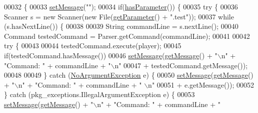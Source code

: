 \begin{DoxyCode}
00032                                                                                                            
        \{
00033         \hyperlink{classpkg__commands_1_1Command_ae210ff216fe908b111ba1c988a963d13}{setMessage}(\textcolor{stringliteral}{""});
00034         \textcolor{keywordflow}{if}(\hyperlink{classpkg__commands_1_1Command_a02af95ab3f1898a66259ab7c177b6998}{hasParameter}()) \{
00035             \textcolor{keywordflow}{try} \{
00036                 Scanner s = \textcolor{keyword}{new} Scanner(\textcolor{keyword}{new} File(\hyperlink{classpkg__commands_1_1Command_a41c92d445be73ea9d62320c65efb8434}{getParameter}() + \textcolor{stringliteral}{".test"}));
00037                 \textcolor{keywordflow}{while} (s.hasNextLine()) \{
00038 
00039                     String commandLine = s.nextLine();
00040                     Command testedCommand = Parser.getCommand(commandLine);
00041 
00042                     \textcolor{keywordflow}{try} \{
00043 
00044                         testedCommand.execute(player);
00045                         \textcolor{keywordflow}{if}(testedCommand.hasMessage())
00046                             \hyperlink{classpkg__commands_1_1Command_ae210ff216fe908b111ba1c988a963d13}{setMessage}(\hyperlink{classpkg__commands_1_1Command_ac2a42e2bab264821892daefaf9a18b6c}{getMessage}() + \textcolor{stringliteral}{"\(\backslash\)n"} + \textcolor{stringliteral}{"Command: "} + commandLine 
      + \textcolor{stringliteral}{"\(\backslash\)n"}
00047                                     + testedCommand.getMessage());
00048 
00049                     \} \textcolor{keywordflow}{catch} (\hyperlink{classpkg__exceptions_1_1NoArgumentException}{NoArgumentException} e) \{
00050                         \hyperlink{classpkg__commands_1_1Command_ae210ff216fe908b111ba1c988a963d13}{setMessage}(\hyperlink{classpkg__commands_1_1Command_ac2a42e2bab264821892daefaf9a18b6c}{getMessage}() + \textcolor{stringliteral}{"\(\backslash\)n"} + \textcolor{stringliteral}{"Command: "} + commandLine + \textcolor{stringliteral}{"
      \(\backslash\)n"}
00051                                 + e.getMessage());
00052                     \} \textcolor{keywordflow}{catch} (pkg\_exceptions.IllegalArgumentException e) \{
00053                         \hyperlink{classpkg__commands_1_1Command_ae210ff216fe908b111ba1c988a963d13}{setMessage}(\hyperlink{classpkg__commands_1_1Command_ac2a42e2bab264821892daefaf9a18b6c}{getMessage}() + \textcolor{stringliteral}{"\(\backslash\)n"} + \textcolor{stringliteral}{"Command: "} + commandLine + \textcolor{stringliteral}{"
}
\end{DoxyCode}
